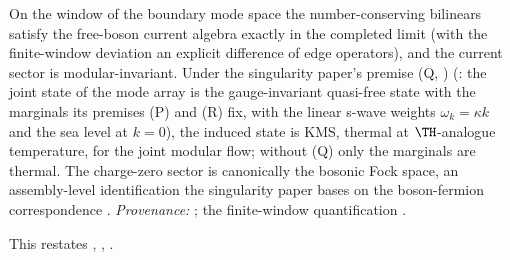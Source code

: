 On the window of the boundary mode space the number-conserving bilinears satisfy the free-boson current algebra exactly in the completed limit (with the finite-window deviation an explicit difference of edge operators), and the current sector is modular-invariant. Under the singularity paper's premise (Q, ) (\cite[Premise~8.1]{ButlerT5}: the joint state of the mode array is the gauge-invariant quasi-free state with the marginals its premises (P) and (R) fix, with the linear s-wave weights $\omega_k = \kappa k$ and the sea level at $k = 0$), the induced state is KMS, thermal at $\TH$-analogue temperature, for the joint modular flow; without (Q) only the marginals are thermal. The charge-zero sector is canonically the bosonic Fock space, an assembly-level identification the singularity paper bases on the boson-fermion correspondence \cite{PressleySegal1986}. \emph{Provenance:} \cite[\S 8, Premise~8.1]{ButlerT5}; the finite-window quantification \cite[\S 6]{ButlerT7}.

This restates , , .
